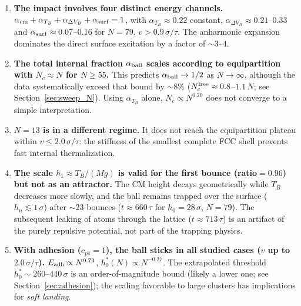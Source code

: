 \documentclass[aps,pre,twocolumn,reprint,superscriptaddress]{revtex4-2}
\begin{document}
\begin{enumerate}

    \item \textbf{The impact involves four distinct energy channels.}
    $\alpha_{\rm cm}+\alpha_{T_B}+\alpha_{\Delta V_B}+\alpha_{\rm surf}=1$,
    with $\alpha_{T_B}\approx0.22$ constant,
    $\alpha_{\Delta V_B}\approx0.21$--$0.33$ and
    $\alpha_{\rm surf}\approx0.07$--$0.16$ for $N=79$,
    $v>0.9\,\sigma/\tau$. The anharmonic expansion dominates the direct
    surface excitation by a factor of $\sim3$--$4$.

    \item \textbf{The total internal fraction $\alpha_{\rm ball}$ scales
    according to equipartition with $N_c\approx N$ for $N\geq55$.}
    This predicts $\alpha_{\rm ball}\to1/2$ as $N\to\infty$, although the
    data systematically exceed that bound by $\sim8\%$
    ($N_c^{\rm free}\approx0.8$--$1.1\,N$; see Section~\ref{sec:sweep_N}).
    Using $\alpha_{T_B}$ alone, $N_c\propto N^{0.20}$ does not converge to
    a simple interpretation.

    \item \textbf{$N=13$ is in a different regime.}
    It does not reach the equipartition plateau within
    $v\leq2.0\,\sigma/\tau$: the stiffness of the smallest complete FCC
    shell prevents fast internal thermalization.

    \item \textbf{The scale $h_1\approx T_B/(Mg)$ is valid for the first
    bounce (ratio$=0.96$) but not as an attractor.}
    The CM height decays geometrically while $T_B$ decreases more slowly,
    and the ball remains trapped over the surface
    ($h_n\lesssim1\,\sigma$) after $\sim23$ bounces ($t\approx660\,\tau$
    for $h_0=28\,\sigma$, $N=79$). The subsequent leaking of atoms through
    the lattice ($t\approx713\,\tau$) is an artifact of the purely
    repulsive potential, not part of the trapping physics.

    \item \textbf{With adhesion ($c_{ps}=1$), the ball sticks in all
    studied cases ($v$ up to $2.0\,\sigma/\tau$).}
    $E_{\rm adh}\propto N^{0.73}$, $h_0^*(N)\propto N^{-0.27}$.
    The extrapolated threshold $h_0^*\sim260$--$440\,\sigma$ is an
    order-of-magnitude bound (likely a lower one; see
    Section~\ref{sec:adhesion}); the scaling favorable to large clusters
    has implications for \emph{soft landing}.

\end{enumerate}
\end{document}
